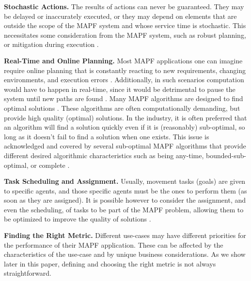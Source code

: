\documentclass{article}
\begin{document}
\textbf{Stochastic Actions.} The results of actions can never be guaranteed. They may be delayed or inaccurately executed, or they may depend on elements that are outside the scope of the MAPF system and whose service time is stochastic. This necessitates some consideration from the MAPF system, such as robust planning, or mitigation during execution 
\cite{atzmon2020robust,atzmon2020probabilistic}
.

\textbf{Real-Time and Online Planning.} Most MAPF applications one can imagine require online planning that is constantly reacting to new requirements, changing environments, and execution errors \cite{ma2019lifelong,vsvancara2019online,atzmon2020robust,bogatarkan2019declarative}. 
Additionally, in such scenarios computation would have to happen in real-time, since it would be detrimental to pause the system until new paths are found \cite{li2021anytime}.
Many MAPF algorithms are designed to find optimal solutions \cite{felner2017search}. These algorithms are often computationally demanding, but provide high quality (optimal) solutions. In the industry, it is often preferred that an algorithm will find a solution quickly even if it is (reasonably) sub-optimal, so long as it doesn't fail to find a solution when one exists. This issue is acknowledged and covered by several sub-optimal MAPF algorithms that provide different desired algorithmic characteristics such as being any-time, bounded-sub-optimal, or complete \cite{barer2014suboptimal}.

\textbf{Task Scheduling and Assignment.} Usually, movement tasks (goals) are given to specific agents, and those specific agents must be the ones to perform them (as soon as they are assigned). It is possible however to consider the assignment, and even the scheduling, of tasks to be part of the MAPF problem, allowing them to be optimized to improve the quality of solutions \cite{ma2019lifelong}.


\textbf{Finding the Right Metric.} Different use-cases may have different priorities for the performance of their MAPF application. These can be affected by the characteristics of the use-case and by unique business considerations. As we show later in this paper, defining and choosing the right metric is not always straightforward.
\end{document}
